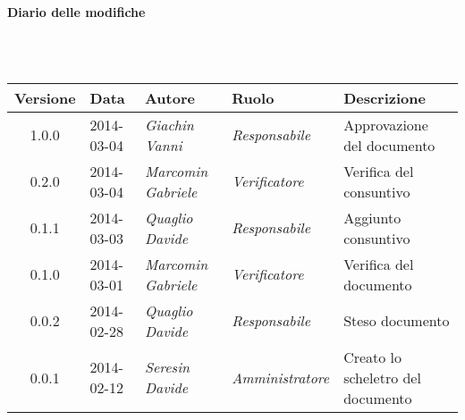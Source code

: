\noindent\begin{Large}\textbf{Diario delle modifiche}\end{Large}\\
\\
\begin{small}
\begin{tabular}{|c|p{1.8cm}|p{2.8cm}|p{2.8cm}|p{3.5cm}|}
\hline
Versione & Data & Autore & Ruolo & Descrizione \\
\hline
\hline
1.0.0 & 2014-03-04 & 
\textit{Giachin Vanni} &
\textit{Responsabile} &  Approvazione del documento\\
\hline
0.2.0 & 2014-03-04 & 
\textit{Marcomin Gabriele} &
\textit{Verificatore} &  Verifica del consuntivo\\
\hline
0.1.1 & 2014-03-03 & 
\textit{Quaglio Davide} &
\textit{Responsabile} &  Aggiunto consuntivo\\
\hline
0.1.0 & 2014-03-01 & 
\textit{Marcomin Gabriele} &
\textit{Verificatore} &  Verifica del documento \\
\hline
0.0.2 & 2014-02-28 & 
\textit{Quaglio Davide} &
\textit{Responsabile} &  Steso documento\\
\hline
0.0.1 & 2014-02-12 & 
\textit{Seresin Davide} &
\textit{Amministratore} &  Creato lo scheletro del documento\\
\hline
\end{tabular}\\
\end{small}